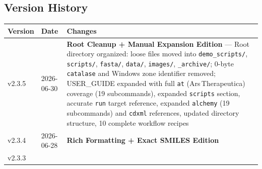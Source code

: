 \documentclass[12pt,a4paper]{article}
\begin{document}
\hypertarget{version-history}{%
\subsection{Version History}\label{version-history}}

\begin{longtable}[]{@{}lll@{}}
\toprule
\begin{minipage}[b]{0.34\columnwidth}\raggedright
Version\strut
\end{minipage} & \begin{minipage}[b]{0.23\columnwidth}\raggedright
Date\strut
\end{minipage} & \begin{minipage}[b]{0.34\columnwidth}\raggedright
Changes\strut
\end{minipage}\tabularnewline
\midrule
\endhead
\begin{minipage}[t]{0.34\columnwidth}\raggedright
v2.3.5\strut
\end{minipage} & \begin{minipage}[t]{0.23\columnwidth}\raggedright
2026-06-30\strut
\end{minipage} & \begin{minipage}[t]{0.34\columnwidth}\raggedright
\textbf{Root Cleanup + Manual Expansion Edition} --- Root directory
organized: loose files moved into \texttt{demo\_scripts/},
\texttt{scripts/}, \texttt{fasta/}, \texttt{data/}, \texttt{images/},
\texttt{\_archive/}; 0-byte \texttt{catalase} and Windows zone
identifier removed; USER\_GUIDE expanded with full \texttt{at}
(Ars\,Therapeutica) coverage (19 subcommands), expanded \texttt{scripts}
section, accurate \texttt{run} target reference, expanded
\texttt{alchemy} (19 subcommands) and \texttt{cdxml} references, updated
directory structure, 10 complete workflow recipes\strut
\end{minipage}\tabularnewline
\begin{minipage}[t]{0.34\columnwidth}\raggedright
v2.3.4\strut
\end{minipage} & \begin{minipage}[t]{0.23\columnwidth}\raggedright
2026-06-28\strut
\end{minipage} & \begin{minipage}[t]{0.34\columnwidth}\raggedright
\textbf{Rich Formatting + Exact SMILES Edition}\strut
\end{minipage}\tabularnewline
\begin{minipage}[t]{0.34\columnwidth}\raggedright
v2.3.3\strut
\end{minipage} & \begin{minipage}[t]{0.23\columnwidth}\raggedright

\end{minipage}
\end{longtable}
\end{document}
